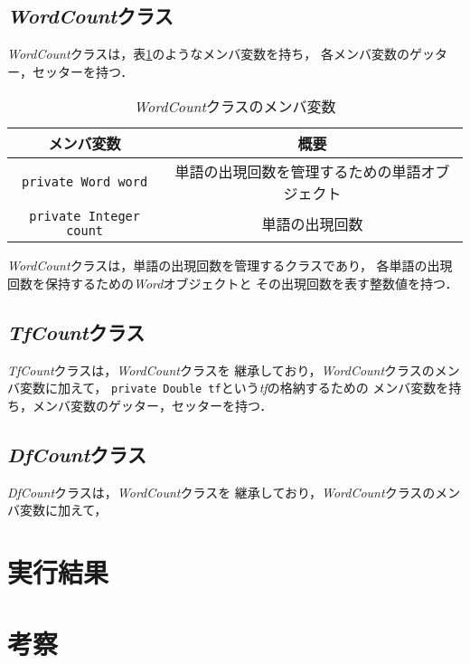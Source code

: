 \documentclass[a4paper,11pt,dvipdfmx]{jsarticle}
\begin{document}
\subsection{\textit{WordCount}クラス}
\textit{WordCount}クラスは，表\ref{table:word_count_class_members}のようなメンバ変数を持ち，
各メンバ変数のゲッター，セッターを持つ．

\begin{table}[H]
\centering
\caption{\textit{WordCount}クラスのメンバ変数}
\label{table:word_count_class_members}
\begin{tabular}{|c|c|}
\hline
メンバ変数 & 概要 \\
\hline
\texttt{private Word word} & 単語の出現回数を管理するための単語オブジェクト \\
\texttt{private Integer count} & 単語の出現回数 \\
\hline
\end{tabular}
\end{table}


\textit{WordCount}クラスは，単語の出現回数を管理するクラスであり，
各単語の出現回数を保持するための\textit{Word}オブジェクトと
その出現回数を表す整数値を持つ．

\subsection{\textit{TfCount}クラス}
\textit{TfCount}クラスは，\textit{WordCount}クラスを
継承しており，\textit{WordCount}クラスのメンバ変数に加えて，
\texttt{private Double tf}という\textit{tf}の格納するための
メンバ変数を持ち，メンバ変数のゲッター，セッターを持つ．

\subsection{\textit{DfCount}クラス}
\textit{DfCount}クラスは，\textit{WordCount}クラスを
継承しており，\textit{WordCount}クラスのメンバ変数に加えて，


\section{実行結果}

\section{考察}
\end{document}
